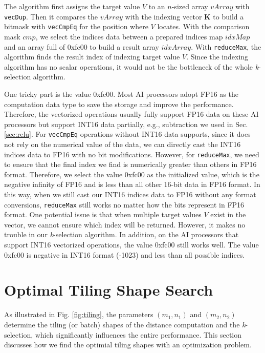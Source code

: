 The algorithm first assigns the target value $V$ to an $n$-sized array $vArray$ with \verb|vecDup|. Then it compares the $vArray$ with the indexing vector \textbf{K} to build a bitmask with \verb|vecCmpEq| for the position where $V$ locates. With the comparison mask $cmp$, we select the indices data between a prepared indices map $idxMap$ and an array full of 0xfc00 to build a result array $idxArray$. With \verb|reduceMax|, the algorithm finds the result index of indexing target value $V$. Since the indexing algorithm has no scalar operations, it would not be the bottleneck of the whole \textit{k}-selection algorithm.

One tricky part is the value 0xfc00. Most AI processors \cite{DBLP:journals/micro/ChoquetteGGSK21, DBLP:conf/isca/LiuDTHLXCC16, DBLP:conf/isca/JouppiYPPABBBBB17, DBLP:conf/hotchips/LiaoTXZ19} adopt FP16 as the computation data type to save the storage and improve the performance. Therefore, the vectorized operations usually fully support FP16 data on these AI processors but support INT16 data partially, e.g., subtraction we used in Sec. \ref{sec:relu}. For \verb|vecCmpEq| operations without INT16 data supports, since it does not rely on the numerical value of the data, we can directly cast the INT16 indices data to FP16 with no bit modifications. However, for \verb|reduceMax|, we need to ensure that the final index we find is numerically greater than others in FP16 format. Therefore, we select the value 0xfc00 as the initialized value, which is the negative infinity of FP16 and is less than all other 16-bit data in FP16 format. In this way, when we still cast our INT16 indices data to FP16 without any format conversions, \verb|reduceMax| still works no matter how the bits represent in FP16 format. One potential issue is that when multiple target values $V$ exist in the vector, we cannot ensure which index will be returned. However, it makes no trouble in our \textit{k}-selection algorithm. In addition, on the AI processors that support INT16 vectorized operations, the value 0xfc00 still works well. The value 0xfc00 is negative in INT16 format (-1023) and less than all possible indices.

\section{Optimal Tiling Shape Search \label{sec:tile}}

As illustrated in Fig. \ref{fig:tiling}, the parameters $(m_1, n_1)$ and $(m_2, n_2)$ determine the tiling (or batch) shapes of the distance computation and the \textit{k}-selection, which significantly influences the entire performance. This section discusses how we find the optimial tiling shapes with an optimization problem.

